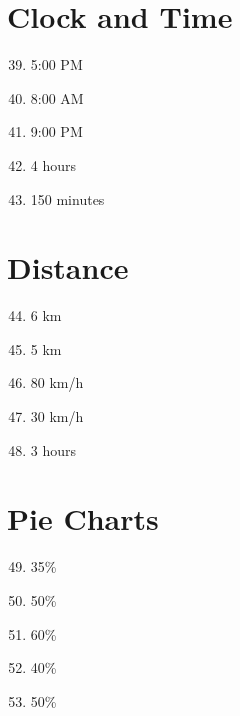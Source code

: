 \documentclass[10pt,a4paper]{article}
\begin{document}
\section*{Clock and Time}

\begin{enumerate}
\setcounter{enumi}{38}
\item 5:00 PM
\item 8:00 AM
\item 9:00 PM
\item 4 hours
\item 150 minutes
\end{enumerate}

\section*{Distance}

\begin{enumerate}
\setcounter{enumi}{43}
\item 6 km
\item 5 km
\item 80 km/h
\item 30 km/h
\item 3 hours
\end{enumerate}


\section*{Pie Charts}

\begin{enumerate}
\setcounter{enumi}{48}
\item 35\%
\item 50\%
\item 60\%
\item 40\%
\item 50\%
\end{enumerate}
\end{document}
